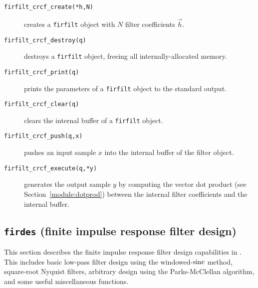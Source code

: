 \begin{description}
\item[{\tt firfilt\_crcf\_create(*h,N)}]
    creates a {\tt firfilt} object with $N$ filter coefficients
    $\vec{h}$.
\item[{\tt firfilt\_crcf\_destroy(q)}]
    destroys a {\tt firfilt} object, freeing all internally-allocated
    memory.
\item[{\tt firfilt\_crcf\_print(q)}]
    prints the parameters of a {\tt firfilt} object to the standard
    output.
\item[{\tt firfilt\_crcf\_clear(q)}]
    clears the internal buffer of a {\tt firfilt} object.
\item[{\tt firfilt\_crcf\_push(q,x)}]
    pushes an input sample $x$ into the internal buffer of the filter
    object.
\item[{\tt firfilt\_crcf\_execute(q,*y)}]
    generates the output sample $y$ by computing the vector dot product
    (see Section~\ref{module:dotprod})
    between the internal filter coefficients and the internal buffer.
\end{description}
%



% 
%

% 
%
\subsection{{\tt firdes} (finite impulse response filter design)}
\label{module:filter:firdes}
This section describes the finite impulse response filter design
capabilities in \liquid.
This includes basic low-pass filter design using the windowed-$\textup{sinc}$
method,
square-root Nyquist filters,
arbitrary design using the Parks-McClellan algorithm,
and some useful miscellaneous functions.

